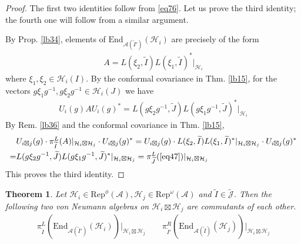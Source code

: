 \documentclass[11pt,b5paper,notitlepage]{article}
\theoremstyle{definition}
\theoremstyle{plain}
\newtheorem{thm}[df]{Theorem}
\newcommand{\wtd}{\widetilde}
\newcommand{\End}{\mathrm{End}} %
\newcommand{\Rep}{\mathrm{Rep}}
\newcommand{\Jtd}{\widetilde{\mathcal J}}
\newcommand{\Ad}{\mathrm{Ad}}
\newcommand{\MA}{\mathcal A}
\newcommand{\MH}{\mathcal H}
\numberwithin{equation}{section}
\begin{document}
\begin{proof}
The first two identities follow from \eqref{eq76}. Let us prove the third identity; the fourth one will follow from a similar argument.

By Prop. \ref{lb34}, elements of $\End_{\MA(\wtd I')}(\MH_i)$ are precisely of the form
\begin{align*}
A=L(\xi_2,\wtd I)L(\xi_1,\wtd I)^*|_{\MH_i}
\end{align*}
where $\xi_1,\xi_2\in\MH_i(I)$. By the conformal covariance in Thm. \ref{lb15}, for the vectors $g\xi_1 g^{-1},g\xi_2 g^{-1}\in\MH_i(J)$ we have
\begin{align*}\label{eq47}
U_i(g)AU_i(g)^*=L(g\xi_2 g^{-1},\wtd J)L(g\xi_1 g^{-1},\wtd J)^*|_{\MH_i}\tag{$\star$}
\end{align*}
By Rem. \ref{lb36} and the conformal covariance in Thm. \ref{lb15},
\begin{align*}
&U_{i\boxtimes j}(g)\cdot \pi^L_{\wtd I}(A)|_{\MH_i\boxtimes\MH_j}\cdot U_{i\boxtimes j}(g)^*=U_{i\boxtimes j}(g)\cdot L(\xi_2,\wtd I)L(\xi_1,\wtd I)^*|_{\MH_i\boxtimes\MH_j}\cdot U_{i\boxtimes j}(g)^*\\
=&L(g\xi_2 g^{-1},\wtd J)L(g\xi_1 g^{-1},\wtd J)^*|_{\MH_i\boxtimes\MH_j}=\pi^L_{\wtd J}(\eqref{eq47})|_{\MH_i\boxtimes\MH_j}
\end{align*}
This proves the third identity.
\end{proof}


\begin{thm}\label{lb47}
Let $\MH_i\in\Rep^\phi(\MA),\MH_j\in\Rep^\omega(\MA)$ and $\wtd I\in\Jtd$. Then the following two von Neumann algebras on $\MH_i\boxtimes\MH_j$ are commutants of each other. 
\begin{align*}
\pi^L_{\wtd I}(\End_{\MA(\wtd I')}(\MH_i))\big|_{\MH_i\boxtimes\MH_j}\qquad\pi^R_{\wtd I'}(\End_{\MA(\wtd I)}(\MH_j))\big|_{\MH_i\boxtimes\MH_j}
\end{align*}
\end{thm}
\end{document}
